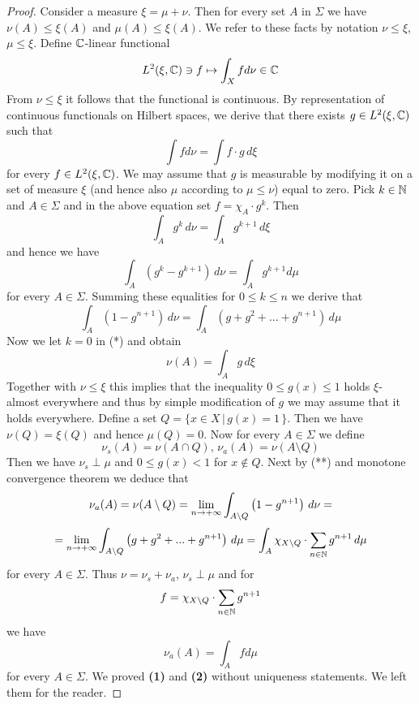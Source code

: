 \begin{proof}
Consider a measure $\xi = \mu + \nu$. Then for every set $A$ in $\Sigma$ we have $\nu(A)\leq \xi(A)$ and $\mu(A)\leq \xi(A)$. We refer to these facts by notation $\nu\leq \xi$, $\mu \leq \xi$. Define ${\mathbb C}$-linear functional 
$$L^2(\xi,{\mathbb C})\ni f \mapsto \int_X f d\nu \in {\mathbb C}$$
From $\nu \leq \xi$ it follows that the functional is continuous. By representation of continuous functionals on Hilbert spaces, we derive that there exists $g\in L^2(\xi,{\mathbb C})$ such that
$$\int f d\nu = \int f\cdot g\,d\xi$$
for every $f\in L^2(\xi,{\mathbb C})$. We may assume that $g$ is measurable by modifying it on a set of measure $\xi$ (and hence also $\mu$ according to $\mu \leq \nu$) equal to zero. Pick $k\in {\mathbb N}$ and $A\in \Sigma$ and in the above equation set $f = \chi_A\cdot g^k$. Then
\begin{equation}
\int_Ag^k\, d\nu = \int_A g^{k+1}\,d\xi\tag{*}
\end{equation}
and hence we have
$$\int_A\left(g^k - g^{k+1}\right)\,d\nu = \int_A g^{k+1}d\mu$$
for every $A\in \Sigma$. Summing these equalities for $0\leq k\leq n$ we derive that
\begin{equation}
\int_A\left(1 - g^{n+1}\right)\,d\nu = \int_A\left(g+g^2+...+g^{n+1}\right)\,d\mu\tag{**}
\end{equation}
Now we let $k = 0$ in (*) and obtain
$$\nu(A)  = \int_Ag\,d\xi $$
Together with $\nu \leq \xi$ this implies that the inequality $0\leq g(x) \leq 1$ holds $\xi$-almost everywhere and thus by simple modification of $g$ we may assume that it holds everywhere. Define a set $Q = \big\{x\in X\,\big|\,g(x) = 1\,\big\}$. Then we have $\nu(Q) = \xi(Q)$ and hence $\mu(Q) = 0$. Now for every $A\in \Sigma$ we define
$$\nu_s(A)= \nu(A\cap Q),\,\nu_a(A) = \nu(A\setminus Q)$$
Then we have $\nu_s \perp \mu$ and $0\leq g(x) < 1$ for $x\not \in Q$. Next by (**) and monotone convergence theorem we deduce that 
$$\nu_a(A) = \nu(A\setminus Q) =  \lim_{n\rightarrow +\infty}\int_{A\setminus Q}\left(1 - g^{n+1}\right)\,d\nu = $$
$$=\lim_{n\rightarrow +\infty}\int_{A\setminus Q}\left(g+g^2+...+g^{n+1}\right)\,d\mu = \int_{A} \chi_{X\setminus Q}\cdot \sum_{n\in {\mathbb N}}g^{n+1}\,d\mu$$
for every $A\in \Sigma$. Thus $\nu = \nu_s + \nu_a$, $\nu_s\perp \mu$ and for 
$$f = \chi_{X\setminus Q}\cdot \sum_{n\in {\mathbb N}}g^{n+1}$$
we have 
$$\nu_a(A) = \int_A fd\mu$$
for every $A\in \Sigma$. We proved \textbf{(1)} and \textbf{(2)} without uniqueness statements. We left them for the reader.
\end{proof}



